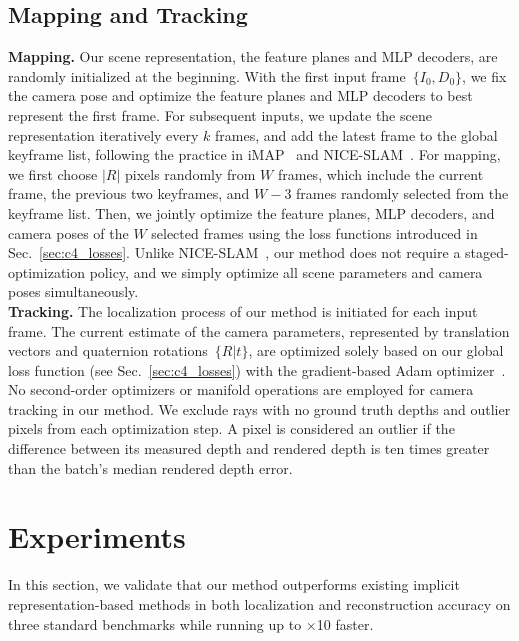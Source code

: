 \subsection{Mapping and Tracking} \label{sec:c4_map_track}
\noindent\textbf{Mapping.} Our scene representation, \ie the feature planes and MLP decoders, are randomly initialized at the beginning. With the first input frame~$\{I_{0}, D_{0}\}$, we fix the camera pose and optimize the feature planes and MLP decoders to best represent the first frame. For subsequent inputs, we update the scene representation iteratively every $k$ frames, and add the latest frame to the global keyframe list, following the practice in iMAP~\citep{sucar2021imap} and NICE-SLAM~\citep{zhu2022nice}. For mapping, we first choose $|R|$ pixels randomly from $W$ frames, which include the current frame, the previous two keyframes, and $W - 3$ frames randomly selected from the keyframe list. Then, we jointly optimize the feature planes, MLP decoders, and camera poses of the $W$ selected frames using the loss functions introduced in Sec.~\ref{sec:c4_losses}. Unlike NICE-SLAM~\citep{zhu2022nice}, our method does not require a staged-optimization policy, and we simply optimize all scene parameters and camera poses simultaneously. \\

\noindent\textbf{Tracking.} The localization process of our method is initiated for each input frame. The current estimate of the camera parameters, represented by translation vectors and quaternion rotations\citep{shoemake1985animating}~$\{R|t\}$, are optimized solely based on our global loss function (see Sec.~\ref{sec:c4_losses}) with the gradient-based Adam optimizer~\citep{adam}. No second-order optimizers or manifold operations are employed for camera tracking in our method. We exclude rays with no ground truth depths and outlier pixels from each optimization step. A pixel is considered an outlier if the difference between its measured depth and rendered depth is ten times greater than the batch's median rendered depth error.

\section{Experiments}
In this section, we validate that our method outperforms existing implicit representation-based methods in both localization and reconstruction accuracy on three standard benchmarks while running up to $\times$10 faster.

